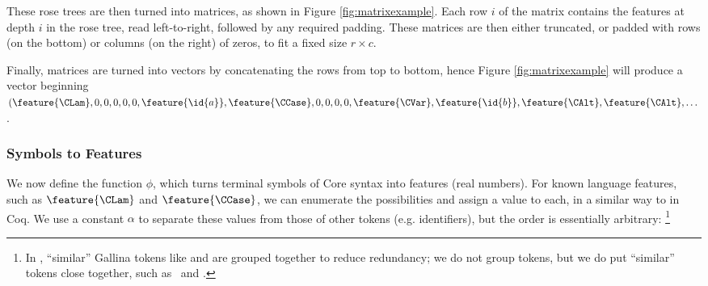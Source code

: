 These rose trees are then turned into matrices, as shown in Figure
\ref{fig:matrixexample}. Each row $i$ of the matrix contains the features at
depth $i$ in the rose tree, read left-to-right, followed by any required
padding. These matrices are then either truncated, or padded with rows (on the
bottom) or columns (on the right) of zeros, to fit a fixed size $r \times c$.

\begin{sloppypar}
  Finally, matrices are turned into vectors by concatenating the rows from top
  to bottom, hence Figure \ref{fig:matrixexample} will produce a vector
  beginning
  $(\feature{\CLam} ,
    0               ,
    0               ,
    0               ,
    0               ,
    0               ,
    \feature{\id{a}},
    \feature{\CCase},
    0               ,
    0               ,
    0               ,
    0               ,
    \feature{\CVar} ,
    \feature{\id{b}},
    \feature{\CAlt} ,
    \feature{\CAlt} ,
    \dots$.
\end{sloppypar}

\subsubsection{Symbols to Features}
\label{sec:symbolstofeatures}

We now define the function $\phi$, which turns terminal symbols of Core syntax
into features (real numbers). For known language features, such as
$\feature{\CLam}$ and $\feature{\CCase}$, we can enumerate the possibilities and
assign a value to each, in a similar way to \cite{DBLP:journals/corr/HerasK14}
in Coq. We use a constant $\alpha$ to separate these values from those of other
tokens (e.g. identifiers), but the order is essentially arbitrary: \footnote{In
  \cite{DBLP:journals/corr/HerasK14}, ``similar'' Gallina tokens like 
  and  are grouped together to reduce redundancy; we do not group
  tokens, but we do put ``similar'' tokens close together, such as \CLocal\ and
  \CGlobal.}


